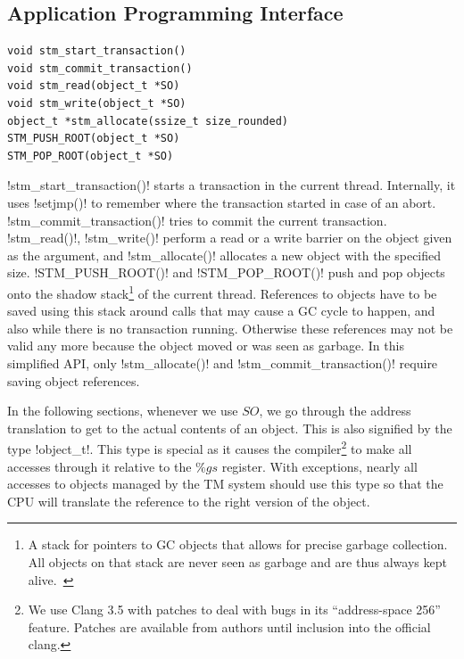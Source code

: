 \documentclass{sigplanconf}
\makeatletter
\renewcommand\lstinline[1][]{%
  \Collectverb{\@@myverb}%
}
\def\@@myverb#1{%
    \begingroup
    \fboxsep=0.2em
    \colorbox{verylightgray}{\oldlstinline|#1|}%
    \endgroup
}
\makeatother
\begin{document}
\subsection{Application Programming Interface\label{sub:Application-Programming-Interfac}}

\begin{lstlisting}
void stm_start_transaction()
void stm_commit_transaction()
void stm_read(object_t *SO)
void stm_write(object_t *SO)
object_t *stm_allocate(ssize_t size_rounded)
STM_PUSH_ROOT(object_t *SO)
STM_POP_ROOT(object_t *SO)
\end{lstlisting}


\lstinline!stm_start_transaction()!  starts a transaction in the
current thread. Internally, it uses \lstinline!setjmp()! to remember
where the transaction started in case of an abort.
\lstinline!stm_commit_transaction()! tries to commit the current
transaction. \lstinline!stm_read()!, \lstinline!stm_write()!  perform
a read or a write barrier on the object given as the argument, and
\lstinline!stm_allocate()!  allocates a new object with the specified
size.  \lstinline!STM_PUSH_ROOT()! and \lstinline!STM_POP_ROOT()!
push and pop objects onto the shadow stack\footnote{A stack for pointers
  to GC objects that allows for precise garbage collection. All objects
  on that stack are never seen as garbage and are thus always kept
  alive.~\cite{fergus02}} of the current thread.  References to objects
have to be saved using this stack around calls that may cause a GC
cycle to happen, and also while there is no transaction
running. Otherwise these references may not be valid any more because
the object moved or was seen as garbage. In this simplified API, only
\lstinline!stm_allocate()!  and \lstinline!stm_commit_transaction()!
require saving object references.

In the following sections, whenever we use $SO$, we go through the
address translation to get to the actual contents of an object. This
is also signified by the type \lstinline!object_t!.  This type is
special as it causes the
compiler\footnote{We use Clang 3.5 with patches to deal with bugs in
its ``address-space 256'' feature. Patches are available from authors
until inclusion into the official clang.} to make all accesses through
it relative to the $\%gs$ register.  With exceptions, nearly all
accesses to objects managed by the TM system should use this type so
that the CPU will translate the reference to the right version of the
object.


\medskip   %
\end{document}
